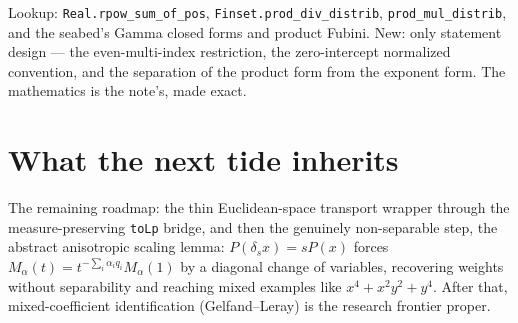 \documentclass[11pt]{article}
\newcommand{\code}[1]{\texttt{#1}}
\begin{document}
Lookup: \code{Real.rpow\_sum\_of\_pos},
\code{Finset.prod\_div\_distrib}, \code{prod\_mul\_distrib}, and the
seabed's Gamma closed forms and product Fubini. New: only statement
design --- the even-multi-index restriction, the zero-intercept
normalized convention, and the separation of the product form from
the exponent form. The mathematics is the note's, made exact.

\section{What the next tide inherits}

The remaining roadmap: the thin Euclidean-space transport wrapper
through the measure-preserving \code{toLp} bridge, and then the
genuinely non-separable step, the abstract anisotropic scaling
lemma: $P(\delta_s x) = s P(x)$ forces
$M_\alpha(t) = t^{-\sum_i \alpha_i q_i} M_\alpha(1)$ by a diagonal
change of variables, recovering weights without separability and
reaching mixed examples like $x^4 + x^2 y^2 + y^4$. After that,
mixed-coefficient identification (Gelfand--Leray) is the research
frontier proper.
\end{document}
